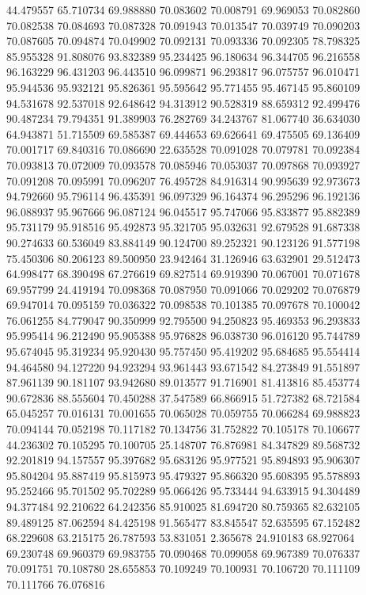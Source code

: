 44.479557
65.710734
69.988880
70.083602
70.008791
69.969053
70.082860
70.082538
70.084693
70.087328
70.091943
70.013547
70.039749
70.090203
70.087605
70.094874
70.049902
70.092131
70.093336
70.092305
78.798325
85.955328
91.808076
93.832389
95.234425
96.180634
96.344705
96.216558
96.163229
96.431203
96.443510
96.099871
96.293817
96.075757
96.010471
95.944536
95.932121
95.826361
95.595642
95.771455
95.467145
95.860109
94.531678
92.537018
92.648642
94.313912
90.528319
88.659312
92.499476
90.487234
79.794351
91.389903
76.282769
34.243767
81.067740
36.634030
64.943871
51.715509
69.585387
69.444653
69.626641
69.475505
69.136409
70.001717
69.840316
70.086690
22.635528
70.091028
70.079781
70.092384
70.093813
70.072009
70.093578
70.085946
70.053037
70.097868
70.093927
70.091208
70.095991
70.096207
76.495728
84.916314
90.995639
92.973673
94.792660
95.796114
96.435391
96.097329
96.164374
96.295296
96.192136
96.088937
95.967666
96.087124
96.045517
95.747066
95.833877
95.882389
95.731179
95.918516
95.492873
95.321705
95.032631
92.679528
91.687338
90.274633
60.536049
83.884149
90.124700
89.252321
90.123126
91.577198
75.450306
80.206123
89.500950
23.942464
31.126946
63.632901
29.512473
64.998477
68.390498
67.276619
69.827514
69.919390
70.067001
70.071678
69.957799
24.419194
70.098368
70.087950
70.091066
70.029202
70.076879
69.947014
70.095159
70.036322
70.098538
70.101385
70.097678
70.100042
76.061255
84.779047
90.350999
92.795500
94.250823
95.469353
96.293833
95.995414
96.212490
95.905388
95.976828
96.038730
96.016120
95.744789
95.674045
95.319234
95.920430
95.757450
95.419202
95.684685
95.554414
94.464580
94.127220
94.923294
93.961443
93.671542
84.273849
91.551897
87.961139
90.181107
93.942680
89.013577
91.716901
81.413816
85.453774
90.672836
88.555604
70.450288
37.547589
66.866915
51.727382
68.721584
65.045257
70.016131
70.001655
70.065028
70.059755
70.066284
69.988823
70.094144
70.052198
70.117182
70.134756
31.752822
70.105178
70.106677
44.236302
70.105295
70.100705
25.148707
76.876981
84.347829
89.568732
92.201819
94.157557
95.397682
95.683126
95.977521
95.894893
95.906307
95.804204
95.887419
95.815973
95.479327
95.866320
95.608395
95.578893
95.252466
95.701502
95.702289
95.066426
95.733444
94.633915
94.304489
94.377484
92.210622
64.242356
85.910025
81.694720
80.759365
82.632105
89.489125
87.062594
84.425198
91.565477
83.845547
52.635595
67.152482
68.229608
63.215175
26.787593
53.831051
2.365678
24.910183
68.927064
69.230748
69.960379
69.983755
70.090468
70.099058
69.967389
70.076337
70.091751
70.108780
28.655853
70.109249
70.100931
70.106720
70.111109
70.111766
76.076816
